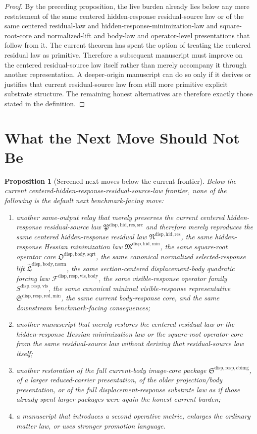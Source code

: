 \documentclass[11pt]{article}
\newcommand{\ResidualSourceLawPackage}{\mathfrak P^{\mathrm{disp,hid,res,src}}}
\newcommand{\ResidualLawPackage}{\mathfrak N^{\mathrm{disp,hid,res}}}
\newcommand{\HiddenMinimizationPackage}{\mathfrak M^{\mathrm{disp,hid,min}}}
\newcommand{\SquareRootOperatorCore}{\mathfrak O^{\mathrm{disp,body,sqrt}}}
\newcommand{\NormalizedLiftPackage}{\widehat{\mathfrak L}^{\mathrm{disp,body,norm}}}
\newcommand{\VisibleBodyForcingLaw}{\mathscr F^{\mathrm{disp,resp,vis,body}}}
\newcommand{\VisibleResponseOperator}{S^{\mathrm{disp,resp,vis}}}
\newcommand{\MinimalReducedStructure}{\mathfrak S^{\mathrm{disp,resp,red,min}}}
\newcommand{\CurrentBodyImageCore}{\mathfrak S^{\mathrm{disp,resp,cbimg}}}
\newtheorem{proposition}{Proposition}
\begin{document}
\begin{proof}
By the preceding proposition, the live burden already lies below any mere restatement of the same centered hidden-response residual-source law or of the same centered residual-law and hidden-response-minimization-law and square-root-core and normalized-lift and body-law and operator-level presentations that follow from it. The current theorem has spent the option of treating the centered residual law as primitive. Therefore a subsequent manuscript must improve on the centered residual-source law itself rather than merely accompany it through another representation. A deeper-origin manuscript can do so only if it derives or justifies that current residual-source law from still more primitive explicit substrate structure. The remaining honest alternatives are therefore exactly those stated in the definition.
\end{proof}

\section{What the Next Move Should Not Be}

\begin{proposition}[Screened next moves below the current frontier]
Below the current centered-hidden-response-residual-source-law frontier, none of the following is the default next benchmark-facing move:
\begin{enumerate}
    \item another same-output relay that merely preserves the current centered hidden-response residual-source law \(\ResidualSourceLawPackage\) and therefore merely reproduces the same centered hidden-response residual law \(\ResidualLawPackage\), the same hidden-response Hessian minimization law \(\HiddenMinimizationPackage\), the same square-root operator core \(\SquareRootOperatorCore\), the same canonical normalized selected-response lift \(\NormalizedLiftPackage\), the same section-centered displacement-body quadratic forcing law \(\VisibleBodyForcingLaw\), the same visible-response operator family \(\VisibleResponseOperator\), the same canonical minimal visible-response representative \(\MinimalReducedStructure\), the same current body-response core, and the same downstream benchmark-facing consequences;
    \item another manuscript that merely restores the centered residual law or the hidden-response Hessian minimization law or the square-root operator core from the same residual-source law without deriving that residual-source law itself;
    \item another restoration of the full current-body image-core package \(\CurrentBodyImageCore\), of a larger reduced-carrier presentation, of the older projection/body presentation, or of the full displacement-response substrate law as if those already-spent larger packages were again the honest current burden;
    \item a manuscript that introduces a second operative metric, enlarges the ordinary matter law, or uses stronger promotion language.
\end{enumerate}
\end{proposition}
\end{document}
